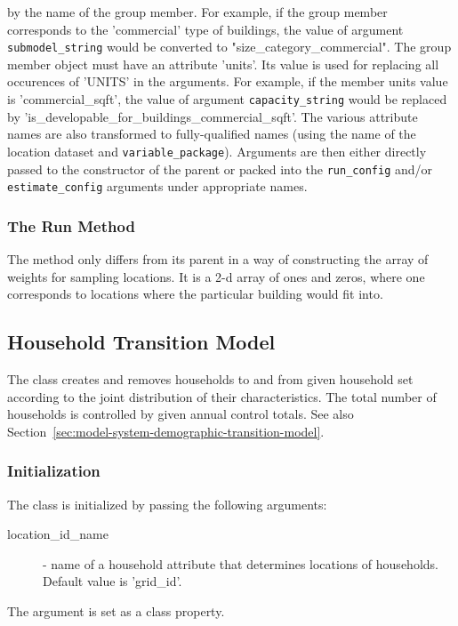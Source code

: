 by the name of the group member. For example, if the group member corresponds to the 'commercial' type of buildings,
the value of argument \verb|submodel_string| would be converted to "size_category_commercial".
The group member object must have an attribute 'units'. Its value is used for replacing all occurences of
'UNITS' in the arguments. For example, if the member units value is 'commercial_sqft', 
the value of argument \verb|capacity_string| would be replaced by  'is_developable_for_buildings_commercial_sqft'.
The various attribute names are also transformed to fully-qualified names (using the name of the location dataset and 
\verb|variable_package|). 
Arguments are then either directly passed to the constructor of the parent or packed into 
the \verb|run_config| and/or
\verb|estimate_config| arguments under appropriate names.
%

\subsubsection{The Run Method}
%
The  method only differs from its parent in a way of constructing the array of weights 
for sampling locations. It is a 2-d array of ones and zeros, where one corresponds to locations
where the particular building would fit into.

%
\subsection{Household Transition Model}
%
\label{sec:household-transition-model}

The class  
creates and removes households to and from given household set according to
the joint distribution of their characteristics. The total number of
households is controlled by given annual control totals. See also Section~\ref{sec:model-system-demographic-transition-model}.

\subsubsection{Initialization}
%
The class is initialized by passing the following arguments:
\begin{description}
\item[location_id_name] - name of a household attribute that determines locations of households.
  Default value is 'grid_id'.
\end{description}
The argument is set as a class property.

